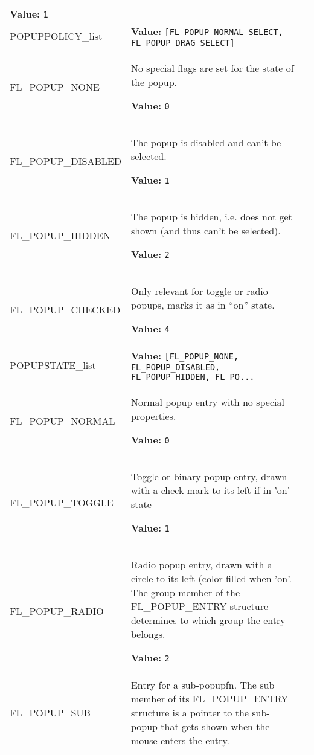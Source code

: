 \begin{longtable}{|p{\varnamewidth}|p{\vardescrwidth}|l}
\textbf{Value:} 
{\tt 1}&\\
\cline{1-2}
\raggedright P\-O\-P\-U\-P\-P\-O\-L\-I\-C\-Y\-\_\-l\-i\-s\-t\- & \raggedright \textbf{Value:} 
{\tt [FL\_POPUP\_NORMAL\_SELECT, FL\_POPUP\_DRAG\_SELECT]}&\\
\cline{1-2}
\raggedright F\-L\-\_\-P\-O\-P\-U\-P\-\_\-N\-O\-N\-E\- & \raggedright No special flags are set for the state of the popup.

\textbf{Value:} 
{\tt 0}&\\
\cline{1-2}
\raggedright F\-L\-\_\-P\-O\-P\-U\-P\-\_\-D\-I\-S\-A\-B\-L\-E\-D\- & \raggedright The popup is disabled and can't be selected.

\textbf{Value:} 
{\tt 1}&\\
\cline{1-2}
\raggedright F\-L\-\_\-P\-O\-P\-U\-P\-\_\-H\-I\-D\-D\-E\-N\- & \raggedright The popup is hidden, i.e. does not get shown (and thus can't be
selected).

\textbf{Value:} 
{\tt 2}&\\
\cline{1-2}
\raggedright F\-L\-\_\-P\-O\-P\-U\-P\-\_\-C\-H\-E\-C\-K\-E\-D\- & \raggedright Only relevant for toggle or radio popups, marks it as in ``on'' state.

\textbf{Value:} 
{\tt 4}&\\
\cline{1-2}
\raggedright P\-O\-P\-U\-P\-S\-T\-A\-T\-E\-\_\-l\-i\-s\-t\- & \raggedright \textbf{Value:} 
{\tt [FL\_POPUP\_NONE, FL\_POPUP\_DISABLED, FL\_POPUP\_HIDDEN, FL\_PO\texttt{...}}&\\
\cline{1-2}
\raggedright F\-L\-\_\-P\-O\-P\-U\-P\-\_\-N\-O\-R\-M\-A\-L\- & \raggedright Normal popup entry with no special properties.

\textbf{Value:} 
{\tt 0}&\\
\cline{1-2}
\raggedright F\-L\-\_\-P\-O\-P\-U\-P\-\_\-T\-O\-G\-G\-L\-E\- & \raggedright Toggle or binary popup entry, drawn with a check-mark to its left if
in 'on' state

\textbf{Value:} 
{\tt 1}&\\
\cline{1-2}
\raggedright F\-L\-\_\-P\-O\-P\-U\-P\-\_\-R\-A\-D\-I\-O\- & \raggedright Radio popup entry, drawn with a circle to its left (color-filled when
'on'. The group member of the FL\_POPUP\_ENTRY structure determines to
which group the entry belongs.

\textbf{Value:} 
{\tt 2}&\\
\cline{1-2}
\raggedright F\-L\-\_\-P\-O\-P\-U\-P\-\_\-S\-U\-B\- & \raggedright Entry for a sub-popupfn. The sub member of its FL\_POPUP\_ENTRY structure is a
pointer to the sub-popup that gets shown when the mouse enters the entry.


\end{longtable}
